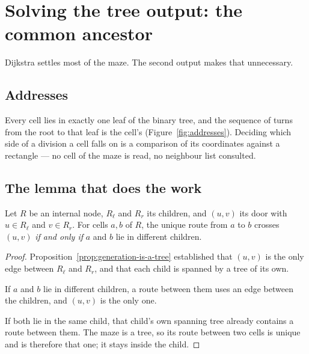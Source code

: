 \section{Solving the tree output: the common ancestor}
\label{sec:common-ancestor}

Dijkstra settles most of the maze. The second output makes that unnecessary.

\subsection{Addresses}

Every cell lies in exactly one leaf of the binary tree, and the sequence of
turns from the root to that leaf is the cell's 
(Figure~\ref{fig:addresses}). Deciding which side of a division a cell falls on
is a comparison of its coordinates against a rectangle --- no cell of the maze
is read, no neighbour list consulted.



\subsection{The lemma that does the work}

\begin{proposition}[Separation]
\label{prop:separation}
Let $R$ be an internal node, $R_\ell$ and $R_r$ its children, and $(u,v)$ its
door with $u\in R_\ell$ and $v\in R_r$. For cells $a,b$ of $R$, the unique route
from $a$ to $b$ crosses $(u,v)$ \emph{if and only if} $a$ and $b$ lie in
different children.
\end{proposition}

\begin{proof}
Proposition~\ref{prop:generation-is-a-tree} established that $(u,v)$ is the only
edge between $R_\ell$ and $R_r$, and that each child is spanned by a tree of its
own.

If $a$ and $b$ lie in different children, a route between them uses an edge
between the children, and $(u,v)$ is the only one.

If both lie in the same child, that child's own spanning tree already contains a
route between them. The maze is a tree, so its route between two cells is
unique and is therefore that one; it stays inside the child.
\end{proof}

